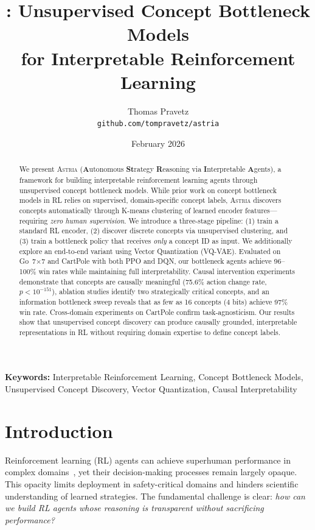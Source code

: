 \documentclass[11pt,a4paper]{article}
\title{
\textbf{\astria: Unsupervised Concept Bottleneck Models\\for Interpretable Reinforcement Learning}
}
\author{
Thomas Pravetz\\
\texttt{github.com/tompravetz/astria}
}
\date{February 2026}
\newcommand{\astria}{\textsc{Astria}}
\begin{document}
\maketitle

\begin{abstract}
We present \astria{} (\textbf{A}utonomous \textbf{St}rategy \textbf{R}easoning via \textbf{I}nterpretable \textbf{A}gents), a framework for building interpretable reinforcement learning agents through unsupervised concept bottleneck models. While prior work on concept bottleneck models in RL relies on supervised, domain-specific concept labels, \astria{} discovers concepts automatically through K-means clustering of learned encoder features---requiring \emph{zero human supervision}. We introduce a three-stage pipeline: (1) train a standard RL encoder, (2) discover discrete concepts via unsupervised clustering, and (3) train a bottleneck policy that receives \emph{only} a concept ID as input. We additionally explore an end-to-end variant using Vector Quantization (VQ-VAE). Evaluated on Go~7$\times$7 and CartPole with both PPO and DQN, our bottleneck agents achieve 96--100\% win rates while maintaining full interpretability. Causal intervention experiments demonstrate that concepts are causally meaningful (75.6\% action change rate, $p < 10^{-151}$), ablation studies identify two strategically critical concepts, and an information bottleneck sweep reveals that as few as 16 concepts (4 bits) achieve 97\% win rate. Cross-domain experiments on CartPole confirm task-agnosticism. Our results show that unsupervised concept discovery can produce causally grounded, interpretable representations in RL without requiring domain expertise to define concept labels.
\end{abstract}

\textbf{Keywords:} Interpretable Reinforcement Learning, Concept Bottleneck Models, Unsupervised Concept Discovery, Vector Quantization, Causal Interpretability

\section{Introduction}

Reinforcement learning (RL) agents can achieve superhuman performance in complex domains~\citep{silver2017mastering, berner2019dota}, yet their decision-making processes remain largely opaque. This opacity limits deployment in safety-critical domains and hinders scientific understanding of learned strategies. The fundamental challenge is clear: \emph{how can we build RL agents whose reasoning is transparent without sacrificing performance?}
\end{document}
